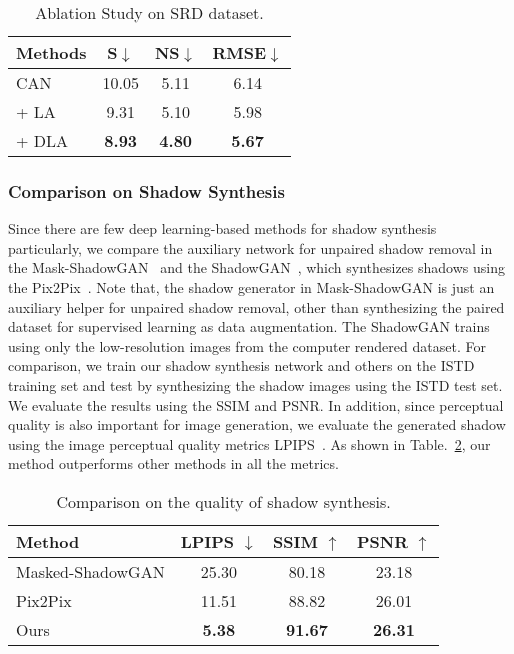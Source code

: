 \documentclass[letterpaper]{article} \usepackage{aaai20}  \usepackage{times}  \usepackage{helvet} \usepackage{courier}  \usepackage[hyphens]{url}  \urlstyle{rm} \def\UrlFont{\rm}  \usepackage{graphicx}  \frenchspacing  \setlength{\pdfpagewidth}{8.5in}  \setlength{\pdfpageheight}{11in}  \usepackage{amssymb}
\begin{document}
\begin{table}[b]
\caption{Ablation Study on SRD dataset.}
\begin{center}
\begin{tabular}{|l|c|c|c|}
\hline
Methods & S$\downarrow$ & NS$\downarrow$ & RMSE$\downarrow$  \\
\hline
\hline
CAN & 10.05 & 5.11 & 6.14 \\
+ LA  & 9.31 & 5.10 & 5.98 \\
+ DLA & \textbf{8.93} & \textbf{4.80} & \textbf{5.67} \\
\hline
\end{tabular}
\end{center}

\label{table:eval}
\end{table}

\subsubsection{Comparison on Shadow Synthesis}
Since there are few deep learning-based methods for shadow synthesis particularly, we compare the auxiliary network for unpaired shadow removal in the Mask-ShadowGAN~\cite{Anonymous:XfCvZjhb} and the ShadowGAN~\cite{zhang2019shadowgan}, which synthesizes shadows using the Pix2Pix~\cite{isola2017image}. Note that, the shadow generator in Mask-ShadowGAN is just an auxiliary helper for unpaired shadow removal, other than synthesizing the paired dataset for supervised learning as data augmentation. The ShadowGAN trains using only the low-resolution images from the computer rendered dataset. For comparison, we train our shadow synthesis network and others on the ISTD training set and test by synthesizing the shadow images using the ISTD test set. We evaluate the results using the SSIM and PSNR. In addition, since perceptual quality is also important for image generation, we evaluate the generated shadow using the image perceptual quality metrics LPIPS~\cite{zhang2018perceptual}. As shown in Table.~\ref{tab:shadow}, our method outperforms other methods in all the metrics.

\begin{table}[t]
\caption{Comparison on the quality of shadow synthesis.}
\begin{center}
\begin{tabular}{|l|c|c|c|}
\hline
Method & LPIPS $\downarrow$ & SSIM $\uparrow$ & PSNR $\uparrow$ \\
\hline
\hline
Masked-ShadowGAN & 25.30 & 80.18 & 23.18  \\
Pix2Pix & 11.51 & 88.82 & 26.01  \\
Ours & \textbf{5.38} & \textbf{91.67} & \textbf{26.31}  \\
\hline
\end{tabular}
\end{center}

\label{tab:shadow}
\end{table}
\end{document}
